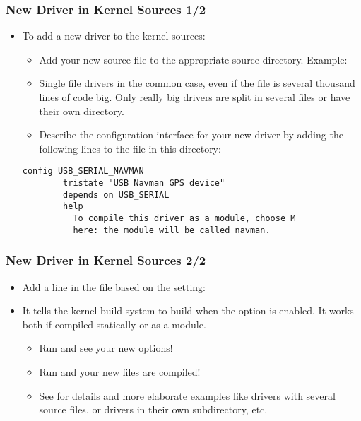 \begin{frame}[fragile]
  \frametitle{New Driver in Kernel Sources 1/2}
  \begin{itemize}
  \item To add a new driver to the kernel sources:
    \begin{itemize}
    \item Add your new source file to the appropriate source
      directory. Example: 
    \item Single file drivers in the common case, even if the file is
      several thousand lines of code big. Only really big drivers are
      split in several files or have their own directory.
    \item Describe the configuration interface for your new driver by
      adding the following lines to the  file in this
      directory:
    \end{itemize}
{\footnotesize
\begin{verbatim}
config USB_SERIAL_NAVMAN
        tristate "USB Navman GPS device"
        depends on USB_SERIAL
        help
          To compile this driver as a module, choose M
          here: the module will be called navman.
\end{verbatim}
}
  \end{itemize}
\end{frame}

\begin{frame}
  \frametitle{New Driver in Kernel Sources 2/2}
  \begin{itemize}
  \item Add a line in the  file based on the
 setting:
  \item It tells the kernel build system to build  when the
     option is enabled. It works both if
    compiled statically or as a module.
    \begin{itemize}
    \item Run  and see your new options!
    \item Run  and your new files are compiled!
    \item See  for details and more
      elaborate examples like drivers with several source files, or
      drivers in their own subdirectory, etc.
    \end{itemize}
  \end{itemize}
\end{frame}

